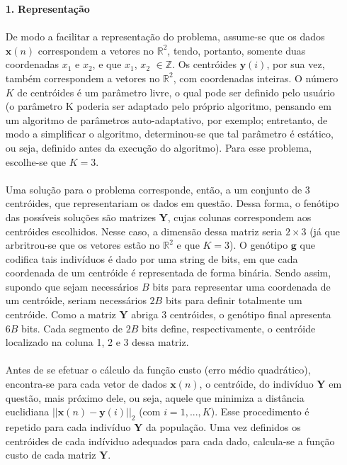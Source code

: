 \documentclass{report}
\begin{document}
\begin{itemize}

	\item[\textbf{1.}] \textbf{Representação}
	
	\paragraph{} De modo a facilitar a representação do problema, assume-se que os dados $\mathbf{x}(n)$ correspondem a vetores no $\mathbb{R}^2$, tendo, portanto, somente duas coordenadas $x_1$ e $x_2$, e que $x_1$, $x_2$ $\in \mathbb{Z}$. Os centróides $\mathbf{y}(i)$, por sua vez, também correspondem a vetores no $\mathbb{R}^2$, com coordenadas inteiras. O número $K$ de centróides é um parâmetro livre, o qual pode ser definido pelo usuário (o parâmetro K poderia ser adaptado pelo próprio algoritmo, pensando em um algoritmo de parâmetros auto-adaptativo, por exemplo; entretanto, de modo a simplificar o algoritmo, determinou-se que tal parâmetro é estático, ou seja, definido antes da execução do algoritmo). Para esse problema, escolhe-se que $K = 3$.\\ 
	
	\paragraph{} Uma solução para o problema corresponde, então, a um conjunto de 3 centróides, que representariam os dados em questão. Dessa forma, o fenótipo das possíveis soluções são matrizes $\mathbf{Y}$, cujas colunas correspondem aos centróides escolhidos. Nesse caso, a dimensão dessa matriz seria $2 \times 3$ (já que arbritrou-se que os vetores estão no $\mathbb{R}^2$ e que $K = 3$). O genótipo $\mathbf{g}$ que codifica tais indivíduos é dado por uma string de bits, em que cada coordenada de um centróide é representada de forma binária. Sendo assim, supondo que sejam necessários $B$ bits para representar uma coordenada de um centróide, seriam necessários $2B$ bits para definir totalmente um centróide. Como a matriz $\mathbf{Y}$ abriga 3 centróides, o genótipo final apresenta $6B$ bits. Cada segmento de $2B$ bits define, respectivamente, o centróide localizado na coluna 1, 2 e 3 dessa matriz.\\
	
	\paragraph{} Antes de se efetuar o cálculo da função custo (erro médio quadrático), encontra-se para cada vetor de dados $\mathbf{x}(n)$, o centróide, do indivíduo $\mathbf{Y}$ em questão, mais próximo dele, ou seja, aquele que minimiza a distância euclidiana $||\mathbf{x}(n) - \mathbf{y}(i)||_2$ (com $i = 1, ..., K$). Esse procedimento é repetido para cada indivíduo $\mathbf{Y}$ da população. Uma vez definidos os centróides de cada indíviduo adequados para cada dado, calcula-se a função custo de cada matriz $\mathbf{Y}$.\\


\end{itemize}
\end{document}
